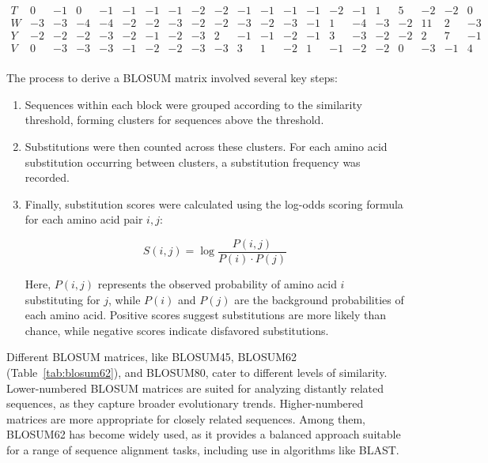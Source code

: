 \begin{table}[tbp]
\[\begin{array}{c|rrrrrrrrrrrrrrrrrrrr}
T  &  0 & -1 &  0 & -1 & -1 & -1 & -1 & -2 & -2 & -1 & -1 & -1 & -1 & -2 & -1 &  1 &  5 & -2 & -2 &  0 \\
W  & -3 & -3 & -4 & -4 & -2 & -2 & -3 & -2 & -2 & -3 & -2 & -3 & -1 &  1 & -4 & -3 & -2 & 11 &  2 & -3 \\
Y  & -2 & -2 & -2 & -3 & -2 & -1 & -2 & -3 &  2 & -1 & -1 & -2 & -1 &  3 & -3 & -2 & -2 &  2 &  7 & -1 \\
V  &  0 & -3 & -3 & -3 & -1 & -2 & -2 & -3 & -3 &  3 &  1 & -2 &  1 & -1 & -2 & -2 &  0 & -3 & -1 &  4 \\
\end{array}
\]
\end{table}

The process to derive a BLOSUM matrix involved several key steps:
\begin{enumerate}
    \item Sequences within each block were grouped according to the similarity threshold, forming clusters for sequences above the threshold.
    \item Substitutions were then counted across these clusters. For each amino acid substitution occurring between clusters, a substitution frequency was recorded.
    \item Finally, substitution scores were calculated using the log-odds scoring formula for each amino acid pair $i, j$:
    
    \begin{equation}
    S(i, j) = \log \frac{P(i, j)}{P(i) \cdot P(j)}
    \end{equation}
    
    Here, $P(i, j)$ represents the observed probability of amino acid $i$ substituting for $j$, while $P(i)$ and $P(j)$ are the background probabilities of each amino acid. Positive scores suggest substitutions are more likely than chance, while negative scores indicate disfavored substitutions.
\end{enumerate}

Different BLOSUM matrices, like BLOSUM45, BLOSUM62 (Table~\ref{tab:blosum62}), and BLOSUM80, cater to different levels of similarity. Lower-numbered BLOSUM matrices are suited for analyzing distantly related sequences, as they capture broader evolutionary trends. Higher-numbered matrices are more appropriate for closely related sequences. Among them, BLOSUM62 has become widely used, as it provides a balanced approach suitable for a range of sequence alignment tasks, including use in algorithms like BLAST.

